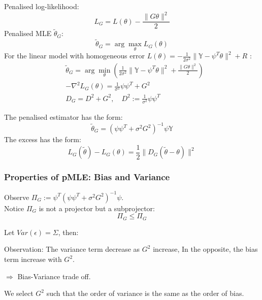 \begin{method}
Penalised log-likelihood:
\begin{equation*}
	L_G = L(\theta) - \frac{\|G\theta\|^2}{2} 
\end{equation*}
Penalised MLE $\tilde{\theta}_G$:
\begin{equation*}
	\tilde{\theta}_G = \arg \max_\theta L_G(\theta)
\end{equation*}	
For the linear model with homogeneous error $L(\theta) = -\frac{1}{2\sigma^2} \| \mathbb{Y} - \psi^T \theta\|^2 + R$ :
\begin{align*}
	&\tilde{\theta}_G = \arg \min_\theta(\frac{1}{2\sigma^2} \| \mathbb{Y} - \psi^T \theta\|^2 + \frac{\|G\theta\|^2}{2} )\\
	&-\nabla^2 L_G(\theta) = \frac{1}{\sigma^2} \psi \psi^T + G^2\\
	&D_G = D^2 + G^2, \quad D^2 := \frac{1}{\sigma^2} \psi \psi^T
\end{align*}
\end{method}



\begin{theorem}
	The penalised estimator has the form:
	\begin{equation*}
		\tilde{\theta}_G = (\psi \psi^T + \sigma^2 G^2)^{-1} \psi \mathbb{Y}
	\end{equation*}
	The excess has the form:
	\begin{equation*}
		L_G(\tilde{\theta}) - L_G(\theta) = \frac{1}{2} \|D_G(\tilde{\theta} - \theta) \|^2
	\end{equation*}
\end{theorem}


\subsubsection*{Properties of pMLE: Bias and Variance}
Observe $\Pi_G := \psi^T (\psi \psi^T + \sigma^2 G^2)^{-1} \psi$. \\
Notice $\Pi_G$ is not a projector but a subprojector:
\begin{equation*}
	\Pi_G \leq \Pi_G
\end{equation*}

\begin{theorem}
	Let $Var(\epsilon) = \Sigma$, then:
	
\end{theorem}

Observation:
The variance term decrease as $G^2$ increase, In the opposite, the bias term increase with $G^2$.\par
$\Rightarrow$ Bias-Variance trade off.\par 
We select $G^2$ such that the order of variance is the same as the order of bias.



